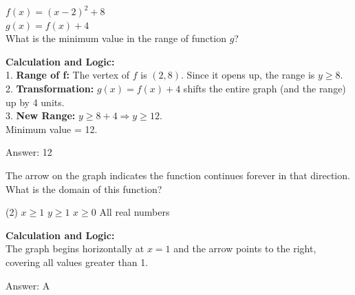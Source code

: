 \documentclass[11pt,paper=a4,answers]{exam}
\begin{document}
\begin{questions}
\vspace{40pt}

\question
$f(x) = (x-2)^2 + 8$ \\
$g(x) = f(x) + 4$ \\
What is the minimum value in the range of function $g$?

\begin{solution}
\textbf{Calculation and Logic:} \\
1. \textbf{Range of f:} The vertex of $f$ is $(2, 8)$. Since it opens up, the range is $y \geq 8$. \\
2. \textbf{Transformation:} $g(x) = f(x) + 4$ shifts the entire graph (and the range) up by 4 units. \\
3. \textbf{New Range:} $y \geq 8 + 4 \Rightarrow y \geq 12$. \\
Minimum value = 12.

\vspace{30pt}

Answer: \colorbox{yellow!100}{12}
\end{solution}

\vspace{40pt}

\question
\begin{center}
\end{center}
The arrow on the graph indicates the function continues forever in that direction. What is the domain of this function?
\begin{tasks}(2)
    \task $x \geq 1$
    \task $y \geq 1$
    \task $x \geq 0$
    \task All real numbers
\end{tasks}

\begin{solution}
\textbf{Calculation and Logic:} \\
The graph begins horizontally at $x=1$ and the arrow points to the right, covering all values greater than 1.

\vspace{30pt}

Answer: \colorbox{yellow!100}{A}
\end{solution}


\end{questions}
\end{document}
